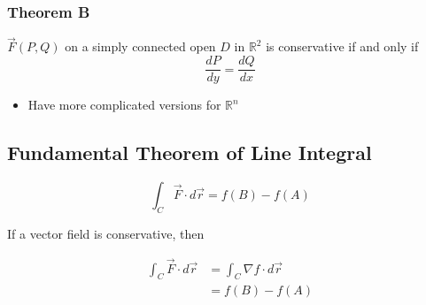     \subsubsection{Theorem B}

      $ \vec{F}\left( P, Q \right) $ on a simply connected open $ D $
      in $ \mathbb{R}^{2} $ is conservative if and only if
      \begin{equation}
        \frac{dP}{dy} = \frac{dQ}{dx}
      \end{equation}

      \begin{itemize}
        \item Have more complicated versions for $ \mathbb{R}^{n} $
      \end{itemize}

  \subsection{Fundamental Theorem of Line Integral}

    \begin{equation}
      \int_{C} \vec{F} \cdot d \vec{r} = f\left( B \right) - f\left( A \right)
    \end{equation}

    If a vector field is conservative, then

    \begin{align}
      \int_{C} \vec{F} \cdot d \vec{r}
        &= \int_{C} \nabla f \cdot d \vec{r} \\
        &= f\left( B \right) - f\left( A \right)
    \end{align}